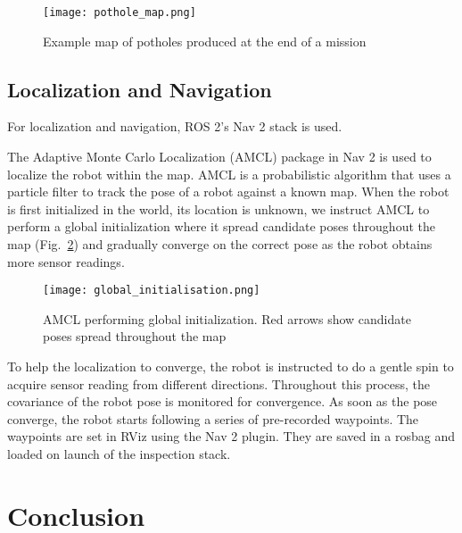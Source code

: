 \documentclass[conference]{IEEEtran}
\begin{document}
\begin{figure}
    \centering
    \texttt{[image: pothole\_map.png]}
    \caption{Example map of potholes produced at the end of a mission}
    \label{fig:pothole_map}
\end{figure}

\subsection{Localization and Navigation}

For localization and navigation, ROS 2's Nav 2 \cite{macenskiMarathonNavigationSystem2020} stack is used.

The Adaptive Monte Carlo Localization (AMCL) package in Nav 2 is used to localize the robot within the map. AMCL is a probabilistic algorithm that uses a particle filter to track the pose of a robot against a known map. When the robot is first initialized in the world, its location is unknown, we instruct AMCL to perform a global initialization where it spread candidate poses throughout the map (Fig.~\ref{fig:global_initialisation}) and gradually converge on the correct pose as the robot obtains more sensor readings.

\begin{figure}
    \centering
    \texttt{[image: global\_initialisation.png]}
    \caption{AMCL performing global initialization. Red arrows show candidate poses spread throughout the map}
    \label{fig:global_initialisation}
\end{figure}

To help the localization to converge, the robot is instructed to do a gentle spin to acquire sensor reading from different directions. Throughout this process, the covariance of the robot pose is monitored for convergence. As soon as the pose converge, the robot starts following a series of pre-recorded waypoints. The waypoints are set in RViz using the Nav 2 plugin. They are saved in a rosbag and loaded on launch of the inspection stack.


\section{Conclusion}




\end{document}

